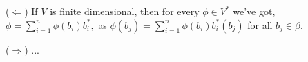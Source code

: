 ($\Leftarrow$) If $V$ is finite dimensional, then for every $\phi \in V^*$ we've got,
$\phi = \sum_{i=1}^{n} \phi(b_i)b_i^*,$
as $\phi(b_j) = \sum_{i=1}^{n} \phi(b_i) b_i^* (b_j)$ for all $b_j \in \beta$.

($\Rightarrow$) ...
